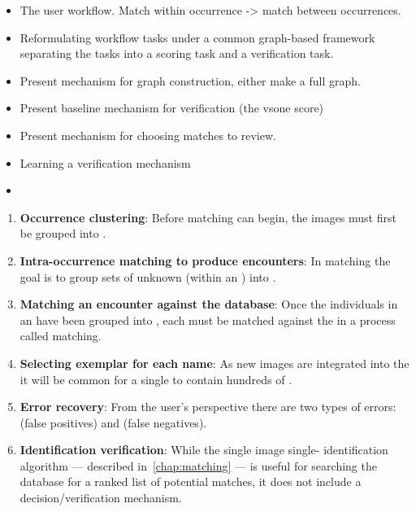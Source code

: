     \begin{itemize}
        \item The user workflow. Match within occurrence -> match between occurrences.
        \item Reformulating workflow tasks under a common graph-based framework
            separating the tasks into a scoring task and a verification task.
        \item Present mechanism for graph construction, either make a full graph.
        \item Present baseline mechanism for verification (the vsone score)
        \item Present mechanism for choosing matches to review. 
        \item Learning a verification mechanism
        \item 
    \end{itemize}
    
    \begin{enumerate}
        \item \textbf{Occurrence clustering}:
            Before \intraoccurrence{} matching can begin, the images must first be grouped into \occurrences{}.
            
        \item \textbf{Intra-occurrence matching to produce encounters}:
            In \intraoccurrence{} matching the goal is to group sets of
              unknown \annots{} (within an \occurrence{}) into \encounters{}.

        \item \textbf{Matching an encounter against the database}:
            Once the individuals in an \occurrence{} have been grouped into
              \encounters{}, each \encounter{} must be matched against the
              \masterdatabase{} in a process called \vsexemplar{} matching.
            
        \item \textbf{Selecting exemplar \annots{} for each name}:
            As new images are integrated into the \masterdatabase{} it will be
              common for a single \name{} to contain hundreds of \annots{}.
            
        \item \textbf{Error recovery}:
            From the user's perspective there are two types of errors:
             (false positives) and  (false negatives).
            
        \item \textbf{Identification verification}:
            While the single image single-\annot{} identification algorithm
              --- described in~\cref{chap:matching} --- is useful for searching
              the database for a ranked list of potential matches, it does not
              include a decision/verification mechanism.
    \end{enumerate}
    
